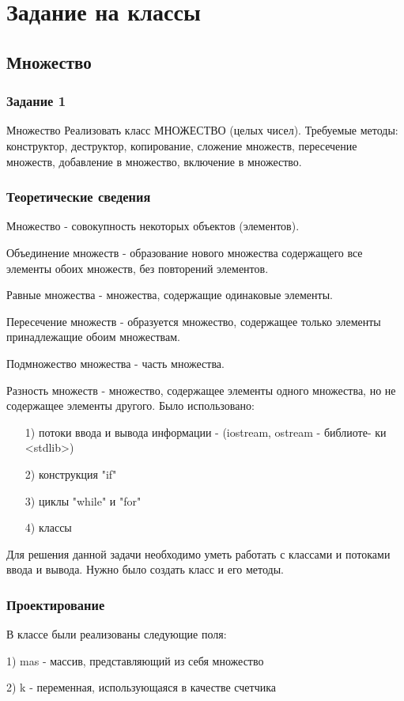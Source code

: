 \documentclass[12pt,a4paper]{report}
\begin{document}
\chapter{Задание на классы}
\section{Множество}
\subsection{Задание 1}
Множество
Реализовать класс МНОЖЕСТВО (целых чисел). Требуемые методы: конструктор, деструктор, копирование, сложение множеств, пересечение множеств, добавление в множество, включение в множество.
\subsection{Теоретические сведения}
Множество - совокупность некоторых объектов (элементов). 

Объединение множеств - образование нового множества содержащего все элементы обоих множеств, без повторений элементов. 

Равные множества - множества, содержащие одинаковые элементы. 

Пересечение множеств - образуется множество, содержащее только элементы принадлежащие обоим множествам. 

Подмножество множества - часть множества.

Разность множеств - множество, содержащее элементы одного множества, но не содержащее элементы другого.
Было использовано:
\begin{enumerate}
\item[1)] потоки ввода и вывода информации  - (iostream, ostream - библиоте-
ки <stdlib>)
\item[2)] конструкция "if"
\item[3)] циклы "while" и "for"
\item[4)] классы
\end{enumerate}
Для решения данной задачи необходимо уметь работать с классами и потоками ввода и вывода.
Нужно было создать класс и его методы.
\subsection{Проектирование}
В классе были реализованы следующие поля: 
\item[1)] mas - массив, представляющий из себя множество
\item[2)] k - переменная, использующаяся в качестве счетчика
\end{document}
